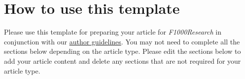 \section*{How to use this template}
Please use this template for preparing your article for \textit{F1000Research} in conjunction with our \href{http://f1000research.com/author-guidelines}{author guidelines}.
You may not need to complete all the sections below depending on the article type.
Please edit the sections below to add your article content and delete any sections that are not required for your article type.
